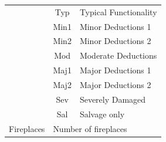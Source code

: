 \documentclass[11pt]{scrartcl} %
\begin{document}
\begin{center}
\begin{tabular}{c c c c c c}
\multicolumn{2}{|c}{} & \multicolumn{1}{c}{Typ} & \multicolumn{3}{l|}{Typical Functionality}\\
\multicolumn{2}{|c}{} & \multicolumn{1}{c}{Min1} & \multicolumn{3}{l|}{Minor Deductions 1}\\
\multicolumn{2}{|c}{} & \multicolumn{1}{c}{Min2} & \multicolumn{3}{l|}{Minor Deductions 2}\\
\multicolumn{2}{|c}{} & \multicolumn{1}{c}{Mod} & \multicolumn{3}{l|}{Moderate Deductions}\\
\multicolumn{2}{|c}{} & \multicolumn{1}{c}{Maj1} & \multicolumn{3}{l|}{Major Deductions 1}\\
\multicolumn{2}{|c}{} & \multicolumn{1}{c}{Maj2} & \multicolumn{3}{l|}{Major Deductions 2}\\
\multicolumn{2}{|c}{} & \multicolumn{1}{c}{Sev} & \multicolumn{3}{l|}{Severely Damaged}\\
\multicolumn{2}{|c}{} & \multicolumn{1}{c}{Sal} & \multicolumn{3}{l|}{Salvage only}\\
\hline
\multicolumn{2}{|c}{Fireplaces} & \multicolumn{4}{l|}{Number of fireplaces}\\
\hline
\end{tabular}
\end{center}
\end{document}
